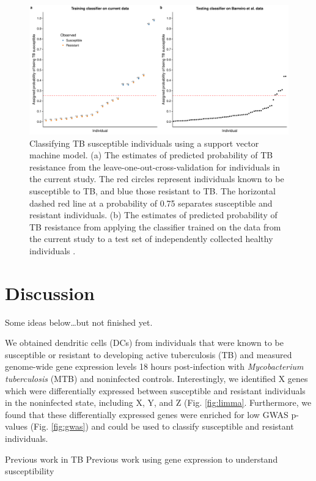 \documentclass[fleqn,10pt]{wlscirep}
\begin{document}
\begin{figure}[ht]
\centering
\includegraphics[width=\linewidth]{../figure/classifier-svm.pdf}
\caption{
Classifying TB susceptible individuals using a support vector machine
model. (a) The estimates of predicted probability of TB resistance
from the leave-one-out-cross-validation for individuals in the current
study. The red circles represent individuals known to be susceptible
to TB, and blue those resistant to TB. The horizontal dashed red line
at a probability of 0.75 separates susceptible and resistant
individuals. (b) The estimates of predicted probability of TB
resistance from applying the classifier trained on the data from the
current study to a test set of independently collected healthy
individuals \cite{Barreiro2012}.
}
\label{fig:classifier}
\end{figure}

\section*{Discussion}

Some ideas below…but not finished yet.

We obtained dendritic cells (DCs) from individuals that were known to
be susceptible or resistant to developing active tuberculosis (TB) and
measured genome-wide gene expression levels 18 hours post-infection
with \emph{Mycobacterium tuberculosis} (MTB) and noninfected controls.
Interestingly, we identified X genes which were differentially
expressed between susceptible and resistant individuals in the
noninfected state, including X, Y, and Z (Fig. \ref{fig:limma}.
Furthermore, we found that these differentially expressed genes were
enriched for low GWAS p-values (Fig. \ref{fig:gwas}) and could be used
to classify susceptible and resistant individuals.

Previous work in TB \cite{Thuong2008}
Previous work using gene expression to understand susceptibility
\cite{Bryant2014}
\end{document}
